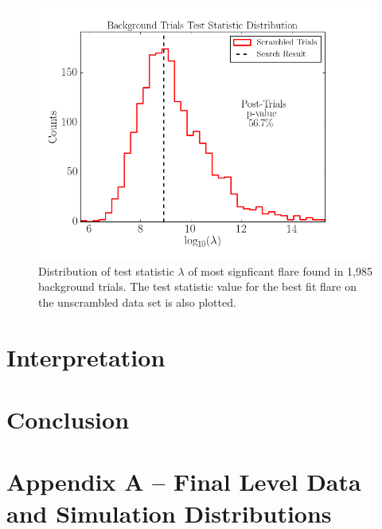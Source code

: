\documentclass{gatech-thesis}
\begin{document}
\begin{figure}[ht]
  \begin{center}
    \includegraphics[width=1.0\textwidth,keepaspectratio]{TestStatisticDistribution_WithResult.png}
  \end{center}
  \caption{Distribution of test statistic $\lambda$ of most signficant flare found in 1,985 background trials. The test statistic value for the best fit flare on the unscrambled data set is also plotted.}
  \label{fig:RealSkyMap}
\end{figure}

\chapter{Interpretation}



\chapter{Conclusion}

\appendix
\chapter{Appendix A -- Final Level Data and Simulation Distributions}


\begin{postliminary}
{}

\begin{vita}

\end{vita}
\end{postliminary}
\end{document}
